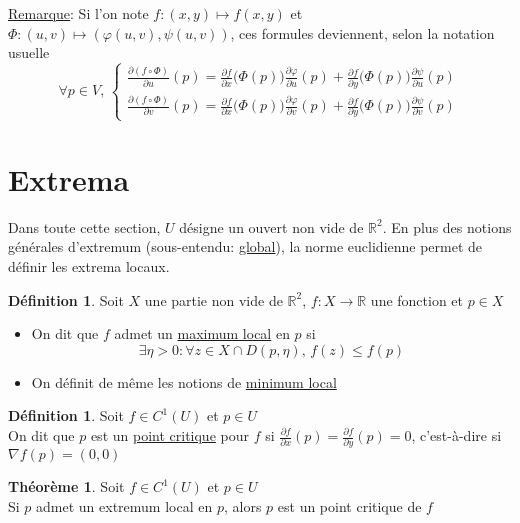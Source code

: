 \documentclass[10pt,a4paper]{article}
\theoremstyle{definition}
\newtheorem{theorem}[proposition]{Théorème}
\newtheorem{definition}[proposition]{Définition}
\begin{document}
\noindent \uline{Remarque}: Si l'on note $f: (x, y) \mapsto f(x, y)$ et $\Phi: (u, v) \mapsto \left(\varphi(u, v), \psi(u, v)\right)$, ces formules deviennent, selon la notation usuelle
\[ \forall p \in V,\, \begin{cases}
\displaystyle
\frac{\partial(f \circ \Phi)}{\partial u}(p) = \frac{\partial f}{\partial x}\big(\Phi(p)\big) \frac{\partial \varphi}{\partial u}(p) + \frac{\partial f}{\partial y}\big(\Phi(p)\big) \frac{\partial \psi}{\partial u}(p) \\
\displaystyle
\frac{\partial(f \circ \Phi)}{\partial v}(p) = \frac{\partial f}{\partial x}\big(\Phi(p)\big) \frac{\partial \varphi}{\partial v}(p) + \frac{\partial f}{\partial y}\big(\Phi(p)\big) \frac{\partial \psi}{\partial v}(p) 
\end{cases} \]

\section{Extrema}
Dans toute cette section, $U$ désigne un ouvert non vide de $\mathbb{R}^2$. En plus des notions générales d'extremum (sous-entendu: \uline{global}), la norme euclidienne permet de définir les extrema locaux.
\begin{definition}
Soit $X$ une partie non vide de $\mathbb{R}^2$, $f: X \to \mathbb{R}$ une fonction et $p \in X$
\begin{itemize}
\item On dit que $f$ admet un \uline{maximum local} en $p$ si
\[ \exists \eta > 0: \forall z \in X \cap D(p, \eta),\, f(z) \leq f(p) \]
\item On définit de même les notions de \uline{minimum local}
\end{itemize}
\end{definition}
\begin{definition}
Soit $f \in C^1(U)$ et $p \in U$ \\
On dit que $p$ est un \uline{point critique} pour $f$ si $\frac{\partial f}{\partial x}(p) = \frac{\partial f}{\partial y}(p) = 0$, c'est-à-dire si $\nabla f(p) = (0, 0)$
\end{definition}
\begin{theorem}
Soit $f \in C^1(U)$ et $p \in U$ \\
Si $p$ admet un extremum local en $p$, alors $p$ est un point critique de $f$
\end{theorem}
\end{document}
